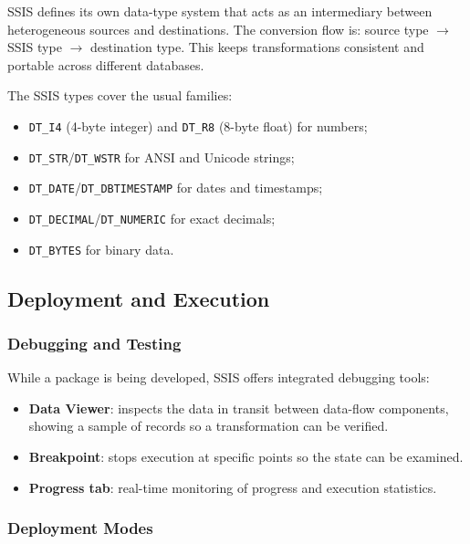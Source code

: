 SSIS defines its own data-type system that acts as an intermediary between heterogeneous sources and destinations. The conversion flow is: source type $\rightarrow$ SSIS type $\rightarrow$ destination type. This keeps transformations consistent and portable across different databases.

The SSIS types cover the usual families:
\begin{itemize}
    \item \texttt{DT\_I4} (4-byte integer) and \texttt{DT\_R8} (8-byte float) for numbers;
    \item \texttt{DT\_STR}/\texttt{DT\_WSTR} for ANSI and Unicode strings;
    \item \texttt{DT\_DATE}/\texttt{DT\_DBTIMESTAMP} for dates and timestamps;
    \item \texttt{DT\_DECIMAL}/\texttt{DT\_NUMERIC} for exact decimals;
    \item \texttt{DT\_BYTES} for binary data.
\end{itemize}

\subsection{Deployment and Execution}
\label{sec:ssis-deployment}

\subsubsection{Debugging and Testing}
\label{subsec:ssis-debug}

While a package is being developed, SSIS offers integrated debugging tools:

\begin{itemize}
    \item \textbf{Data Viewer}: inspects the data in transit between data-flow components, showing a sample of records so a transformation can be verified.
    \item \textbf{Breakpoint}: stops execution at specific points so the state can be examined.
    \item \textbf{Progress tab}: real-time monitoring of progress and execution statistics.
\end{itemize}

\subsubsection{Deployment Modes}
\label{subsec:ssis-deployment-modes}

